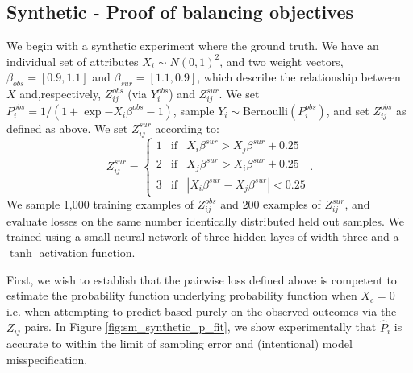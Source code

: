     \subsection{Synthetic - Proof of balancing objectives}
    
        We begin with a synthetic experiment where the ground truth.  We have an individual set of attributes $X_i \sim N(0, 1)^2$, and two weight vectors,  $\beta_{obs} = [0.9, 1.1]$ and $\beta_{sur} = [1.1, 0.9]$, which describe the relationship between $X$ and,respectively,  $Z_{ij}^{obs}$ (via $Y_{i}^{obs}$) and $Z_{ij}^{sur}$.  We set $P_i^{obs} = 1 / (1 + \exp{-X_i \beta^{obs} - 1})$, sample $Y_i \sim \mbox{Bernoulli}(P_i^{obs})$, and set $Z_{ij}^{obs}$ as defined as above.  We set $Z_{ij}^{sur}$ according to:
            $$ Z_{ij}^{sur} = \left\{ \begin{array}{lll}
                    1 & \mbox{if} & X_{i}\beta^{sur} > X_{j}\beta^{sur} + 0.25\\
                    2 & \mbox{if} & X_{j}\beta^{sur} > X_{i}\beta^{sur} + 0.25 \\
                    3 & \mbox{if} & | X_{i}\beta^{sur} - X_{j}\beta^{sur} | < 0.25
                \end{array} \right. .$$
        We sample 1,000 training examples of $Z_{ij}^{obs}$ and 200 examples of $Z_{ij}^{sur}$, and evaluate losses on the same number identically distributed held out samples.  We trained using a small neural network of three hidden layes of width three and a $\tanh$ activation function.
        
        First, we wish to establish that the pairwise loss defined above is competent to estimate the probability function underlying probability function when $X_c = 0$ i.e. when attempting to predict based purely on the observed outcomes via the $Z_{ij}$ pairs.  In Figure \ref{fig:sm_synthetic_p_fit}, we show experimentally that $\hat{P}_i$ is accurate to within the limit of sampling error and (intentional) model misspecification.
        
